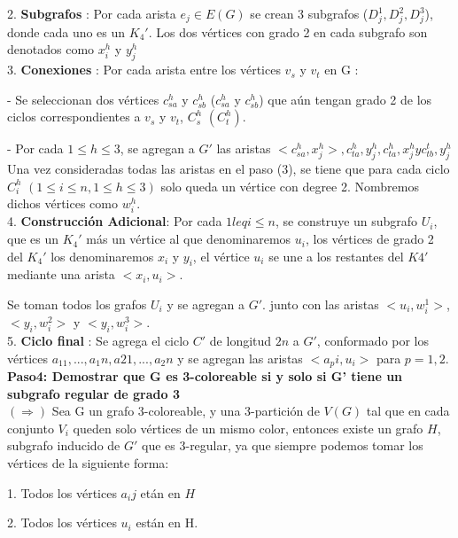 \documentclass[
10pt, %
a4paper, %
oneside, %
headinclude,footinclude, %
BCOR5mm, %
]{scrartcl}
\begin{document}
2. \textbf{Subgrafos} : Por cada arista $e_j \in E(G)$ se crean 3 subgrafos ($D^1_j, D^2_j, D^3_j$), donde cada uno es un $K_4'$. Los dos vértices con grado 2 en cada 
subgrafo son denotados como $x^h_i$ y $y^h_j$\\

3. \textbf{Conexiones} : Por cada arista entre los vértices $v_s$ y $v_t$ en G :

- Se seleccionan dos vértices $c_{sa}^{h}$ y $c_{sb}^{h}$ ($c_{sa}^{h}$ y $c_{sb}^{h}$) que aún tengan grado 2 de los ciclos correspondientes a $v_s$ y $v_t$, $C^h_s$ $(C^h_t)$.

- Por cada $1\leq h \leq 3$, se agregan a $G'$ las aristas $<c_{sa}^{h},x^h_j> , c_{ta}^{h},y^h_j , c_{ta}^{h},x^h_j  y c_{tb}^{t}, y^h_j$\\

Una vez consideradas todas las aristas en
el paso (3), se tiene que para cada ciclo $C^h_i$ $( 1\leq i \leq n, 1 \leq h \leq 3 )$ solo queda un vértice con degree 2. Nombremos
dichos vértices como $w^h_i$.\\

4. \textbf{Construcción Adicional}: Por cada $1 leq i \leq n$, se construye un subgrafo $U_i$, que es un $K_4'$ más un vértice al que denominaremos $u_i$, los vértices de grado 2 del $K_4'$ los denominaremos 
$x_i$ y $y_i$, el vértice $u_i$ se une a los restantes del $K4'$ mediante una arista $<x_i, u_i>$. 

Se toman todos los grafos $U_i$ y se agregan a $G'$. junto con las aristas $<u_i,w^1_i>$, $<y_i, w^2_i>$ y $<y_i, w^3_i>$.\\


5. \textbf{Ciclo final} : Se agrega el ciclo $C'$ de longitud $2n$ a $G'$, conformado por los vértices ${a_11,..., a_1n, a21,..., a_2n}$ y se agregan las aristas $<a_pi, u_i>$ para $p = 1,2$.\\


\textbf{Paso4: Demostrar que G es 3-coloreable si y solo si G' tiene un subgrafo regular de grado 3  }\\

$(\Rightarrow)$ Sea G un grafo 3-coloreable, y una 3-partición de $V(G)$ tal que en cada conjunto $V_i$ queden solo vértices de un mismo color, entonces existe un grafo $H$, 
subgrafo inducido de $G'$ que es 3-regular, ya que siempre podemos tomar los vértices de la siguiente forma:

1. Todos los vértices $a_ij$ etán en $H$

2. Todos los vértices $u_i$ est\'an en H.
\end{document}
